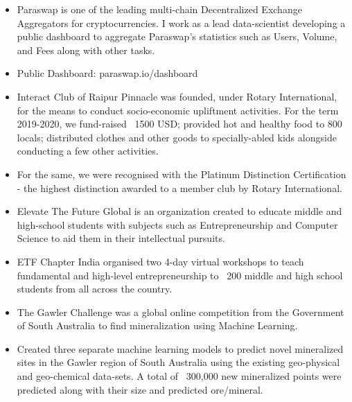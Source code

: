 \documentclass[10pt,a4paper,ragged2e]{altacv}
\begin{document}
\begin{itemize}
    \item {Paraswap is one of the leading multi-chain Decentralized Exchange Aggregators for cryptocurrencies. I work as a lead data-scientist developing a public dashboard to aggregate Paraswap's statistics such as Users, Volume, and Fees along with other tasks.}
    \item {Public Dashboard: paraswap.io/dashboard}
\end{itemize}
\divider
{}
\begin{itemize}
    \item {Interact Club of Raipur Pinnacle was founded, under Rotary International, for the means to conduct socio-economic upliftment activities. For the term 2019-2020, we fund-raised ~1500 USD; provided hot and healthy food to 800 locals; distributed clothes and other goods to specially-abled kids alongside conducting a few other activities.}
    \item {For the same, we were recognised with the Platinum Distinction Certification - the highest distinction awarded to a member club by Rotary International.}
\end{itemize}
\divider

\begin{itemize}
    \item Elevate The Future Global is an organization created to educate middle and high-school students with subjects such as Entrepreneurship and Computer Science to aid them in their intellectual pursuits.
    \item ETF Chapter India organised two 4-day virtual workshops to teach fundamental and high-level entrepreneurship to ~200 middle and high school students from all across the country.
\end{itemize}
\divider
{}
\begin{itemize}
    \item The Gawler Challenge was a global online competition from the Government of South Australia to find mineralization using Machine Learning.
    \item Created three separate machine learning models to predict novel mineralized sites in the Gawler region of South Australia using the existing geo-physical and geo-chemical data-sets. A total of ~300,000 new mineralized points were predicted along with their size and predicted ore/mineral.
\end{itemize}
\divider
\end{document}
